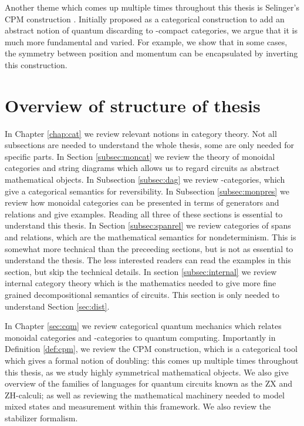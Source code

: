 Another theme which comes up multiple times throughout this thesis is Selinger's CPM construction \cite{cpm}.  Initially proposed as a categorical construction to add an abstract notion of  quantum discarding to \dag-compact categories, we argue that it is much more fundamental and varied. For example, we show that in some cases, the symmetry between position and momentum can be encapsulated by inverting this construction.

\section{Overview of structure of thesis}
In Chapter \ref{chap:cat} we review relevant notions in category theory. Not all subsections are needed to understand the whole thesis, some are only needed for specific parts.  In Section \ref{subsec:moncat} we review the theory of monoidal categories and string diagrams which allows us to regard circuits as abstract mathematical objects.  In Subsection \ref{subsec:dag} we review \dag-categories, which give a categorical semantics for reversibility. In Subsection \ref{subsec:monpres} we review how monoidal categories can be presented in terms of generators and relations and give examples.  Reading all three of these sections is essential to understand this thesis.
In Section \ref{subsec:spanrel} we review categories of spans and relations, which are the mathematical semantics for  nondeterminism.  This is somewhat more technical than the preceeding sections, but is not as essential to understand the thesis.  The less interested readers can read the examples in this section, but skip the technical details.  In section \ref{subsec:internal} we review internal category theory which is the mathematics needed to give more fine grained decompositional semantics of circuits.    This section is only needed to understand Section \ref{sec:dist}.

In Chapter \ref{sec:cqm} we review  categorical quantum mechanics which relates monoidal categories and \dag-categories to quantum computing. Importantly in Definition \ref{def:cpm}, we review the CPM construction, which is a categorical tool which gives a formal notion of doubling: this comes up multiple times throughout this thesis, as we study highly symmetrical mathematical objects. We also give overview of the families of languages for quantum circuits known as the  ZX and ZH-calculi; as well as reviewing the mathematical machinery needed to model mixed states and measurement within this framework.  We also review the stabilizer formalism.

